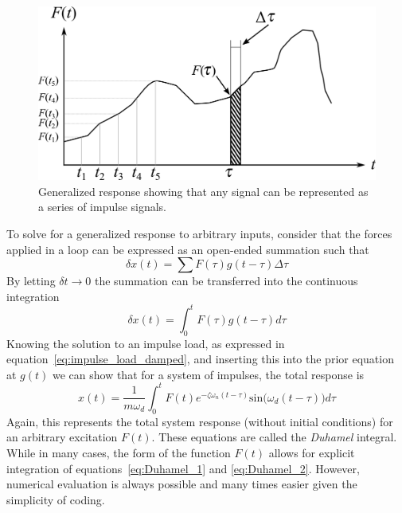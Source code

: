 \documentclass[12pt,letter]{article}
\begin{document}
\begin{figure}[H]
	\centering
	\includegraphics[]{../figures/Arbitary_excitation_forces.png}
	\caption{Generalized response showing that any signal can be represented as a series of impulse signals. }
	\label{fig:Arbitary_excitation_forces}
\end{figure}

To solve for a generalized response to arbitrary inputs, consider that the forces applied in a loop can be expressed as an open-ended summation such that 
\begin{equation}
	\delta x(t) = \sum F( \tau ) g(t- \tau ) \Delta \tau
\end{equation}
By letting $\delta t \rightarrow 0$ the summation can be transferred into the continuous integration  
\begin{equation}
	\delta x(t) = \int_{0}^{t} F( \tau ) g(t- \tau ) d \tau
	\label{eq:Duhamel_1}	
\end{equation}
Knowing the solution to an impulse load, as expressed in equation~\ref{eq:impulse_load_damped}, and inserting this into the prior equation at $g(t)$ we can show that for a system of impulses, the total response is
\begin{equation}
	x(t) = \frac{1}{m \omega_d} \int_{0}^{t} F(t) e^{-\zeta \omega_n (t-\tau)} \text{sin}\big(\omega_d(t-\tau)\big) d \tau
	\label{eq:Duhamel_2}	
\end{equation}
Again, this represents the total system response (without initial conditions) for an arbitrary excitation $F(t)$.  These equations are called the \textit{Duhamel} integral. While in many cases, the form of the function $F(t)$ allows for explicit integration of equations~\ref{eq:Duhamel_1} and \ref{eq:Duhamel_2}. However, numerical evaluation is always possible and many times easier given the simplicity of coding. 
\end{document}
